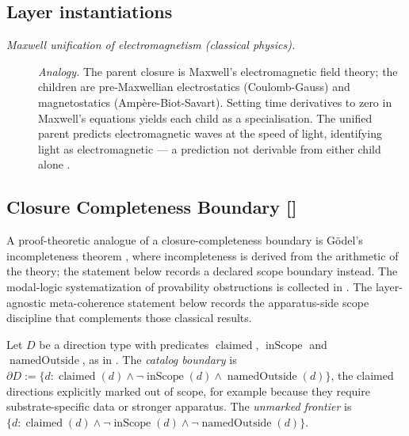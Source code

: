 \subsection*{Layer instantiations}\label{layer-inst:F51}

\begingroup\small
\begin{description}
\item[\emph{Maxwell unification of electromagnetism
(classical physics).}] \textit{Analogy.}
The parent closure is Maxwell's electromagnetic
field theory; the children are pre-Maxwellian
electrostatics (Coulomb-Gauss) and magnetostatics
(Amp\`ere-Biot-Savart).  Setting time derivatives to
zero in Maxwell's equations yields each child as a
specialisation.  The unified parent predicts
electromagnetic waves at the speed of light,
identifying light as electromagnetic — a
prediction not derivable from either child alone
\citep{Maxwell1865Dynamical}.

\end{description}
\endgroup


\subsection{Closure Completeness Boundary [\texorpdfstring{}{F52}]}\label{sec:self-reference-limits:closure-completeness}

A proof-theoretic analogue of a closure-completeness boundary is
G\"odel's incompleteness theorem \citep{Godel1931Unentscheidbare}, where
incompleteness is derived from the arithmetic of the theory; the statement
below records a declared scope boundary instead. The modal-logic systematization of provability obstructions is
collected in \citet{Boolos1993LogicProvability}.  The layer-agnostic
meta-coherence statement below records the apparatus-side scope
discipline that complements those classical results.

\begin{definition}\label{def:catalog-boundary}
Let \(D\) be a direction type with predicates \(\operatorname{claimed}\),
\(\operatorname{inScope}\) and \(\operatorname{namedOutside}\), as in
. The \emph{catalog boundary} is
\(\partial D:=\{d:\operatorname{claimed}(d)\wedge\neg\operatorname{inScope}(d)
\wedge\operatorname{namedOutside}(d)\}\), the claimed directions explicitly
marked out of scope, for example because they require substrate-specific data
or stronger apparatus. The \emph{unmarked frontier} is
\(\{d:\operatorname{claimed}(d)\wedge\neg\operatorname{inScope}(d)\wedge
\neg\operatorname{namedOutside}(d)\}\).
\end{definition}

